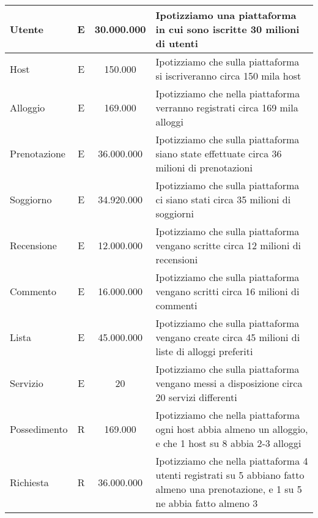 \begin{longtable}{|l|c|c|p{6.2cm}|}
    \hline
    \endlastfoot
    Utente                   & E             & 30.000.000      & {Ipotizziamo una piattaforma in cui sono iscritte 30 milioni di utenti}                                                                      \\\hline
    Host                     & E             & 150.000         & {Ipotizziamo che sulla piattaforma si iscriveranno circa 150 mila host}                                                                      \\\hline
    Alloggio                 & E             & 169.000         & {Ipotizziamo che nella piattaforma verranno registrati circa 169 mila alloggi}                                                               \\\hline
    Prenotazione             & E             & 36.000.000      & {Ipotizziamo che sulla piattaforma siano state effettuate circa 36 milioni di prenotazioni}                                                  \\\hline
    Soggiorno                & E             & 34.920.000      & {Ipotizziamo che sulla piattaforma ci siano stati circa 35 milioni di soggiorni}                                                             \\\hline
    Recensione               & E             & 12.000.000      & {Ipotizziamo che sulla piattaforma vengano scritte circa 12 milioni di recensioni}                                                           \\\hline
    Commento                 & E             & 16.000.000      & {Ipotizziamo che sulla piattaforma vengano scritti circa 16 milioni di commenti}                                                             \\\hline
    Lista                    & E             & 45.000.000      & {Ipotizziamo che sulla piattaforma vengano create circa 45 milioni di liste di alloggi preferiti}                                            \\\hline
    Servizio                 & E             & 20              & {Ipotizziamo che sulla piattaforma vengano messi a disposizione circa 20 servizi differenti}                                                 \\\hline
    Possedimento             & R             & 169.000         & {Ipotizziamo che nella piattaforma ogni host abbia almeno un alloggio, e che 1 host su 8 abbia 2-3 alloggi}                                  \\\hline
    Richiesta                & R             & 36.000.000      & {Ipotizziamo che nella piattaforma 4 utenti registrati su 5 abbiano fatto almeno una prenotazione, e 1 su 5 ne abbia fatto almeno 3}         \\\hline

\end{longtable}
